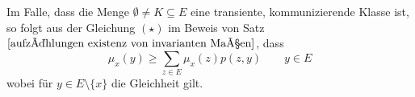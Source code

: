 Im Falle, dass die Menge $\emptyset \neq K \subseteq E$ eine transiente, kommunizierende Klasse ist, so folgt aus der Gleichung $(\star)$ im Beweis von Satz $\ref{aufzählungen existenz von invarianten Maßen}$, dass
\begin{equation*}
\mu_{x}(y) \geq \sum_{z \in E} \mu_{x}(z)p(z,y) \qquad y \in E
\end{equation*}
wobei für $y \in E \setminus \lbrace x \rbrace$ die Gleichheit gilt.
